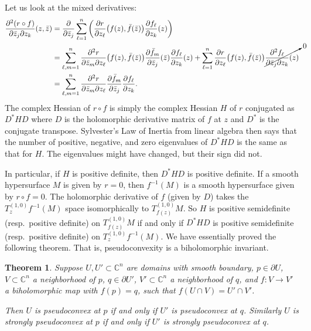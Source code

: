 \documentclass[12pt,openany]{book}
\newcommand{\C}{{\mathbb{C}}}
\theoremstyle{plain}
\newtheorem{thm}{Theorem}[section]
\theoremstyle{remark}
\theoremstyle{definition}
\theoremstyle{exercise}
\theoremstyle{example}
\begin{document}
Let us look at the mixed derivatives:
\begin{equation*}
\begin{split}
\frac{\partial^2 (r \circ f)}{\partial \bar{z}_j \partial z_k} (z,\bar{z})
& =
\frac{\partial}{\partial \bar{z}_j }
\sum_{\ell=1}^n 
\left(
\frac{\partial r}{\partial z_\ell} \bigl(f(z),\bar{f}(\bar{z})\bigr)
\frac{\partial f_\ell}{\partial z_k} (z) 
\right)
\\
& =
\sum_{\ell,m=1}^n 
\frac{\partial^2 r}{\partial \bar{z}_m \partial z_\ell }
\bigl(f(z),\bar{f}(\bar{z})\bigr)
\frac{\partial \bar{f}_m}{\partial \bar{z}_j} (\bar{z}) 
\frac{\partial f_\ell}{\partial z_k} (z) 
+
\sum_{\ell=1}^n 
\frac{\partial r}{\partial z_\ell} \bigl(f(z),\bar{f}(\bar{z})\bigr)
\cancelto{0}{\frac{\partial^2 f_\ell}{\partial \bar{z}_j \partial z_k} (z)}
\\
&=
\sum_{\ell,m=1}^n 
\frac{\partial^2 r}{\partial \bar{z}_m \partial z_\ell}
\frac{\partial \bar{f}_m}{\partial \bar{z}_j} 
\frac{\partial f_\ell}{\partial z_k} .
\end{split}
\end{equation*}
The complex Hessian of $r \circ f$ is simply the complex Hessian $H$ of $r$
conjugated as $D^*HD$ where $D$ is the holomorphic
derivative matrix of $f$ at $z$ and
$D^*$ is the conjugate transpose.  Sylvester's Law of Inertia from linear
algebra then says that the number of positive, negative, and zero
eigenvalues of $D^*HD$ is the same as that for $H$.  The
eigenvalues might have changed, but their sign did not.

In particular, if $H$ is positive definite, then $D^*HD$ is positive
definite.  If a smooth hypersurface $M$ is given by $r=0$, then $f^{-1}(M)$ is
a smooth hypersurface given by $r \circ f = 0$.
The holomorphic derivative of $f$ (given by $D$)
takes the
$T_{z}^{(1,0)}f^{-1}(M)$
space isomorphically to
$T_{f(z)}^{(1,0)}M$.
So $H$ is positive semidefinite (resp.\ positive definite)
on $T_{f(z)}^{(1,0)}M$ if and only if $D^*HD$ is positive semidefinite
(resp.\ positive definite) on
$T_{z}^{(1,0)} f^{-1}(M)$.
We have essentially proved the following theorem.  That is, pseudoconvexity is a
biholomorphic invariant.

\begin{thm}
Suppose $U, U' \subset \C^n$ are domains with smooth boundary,
$p \in \partial U$, $V \subset \C^n$ a neighborhood of $p$,
$q \in \partial U'$, $V' \subset \C^n$ a neighborhood of $q$,
and $f \colon V \to V'$ a biholomorphic map with $f(p) = q$, such that
$f(U \cap V) = U' \cap V'$.

Then $U$ is pseudoconvex at $p$ if and only if $U'$ is pseudoconvex at $q$.
Similarly
$U$ is strongly pseudoconvex at $p$ if and only if $U'$ is strongly pseudoconvex at $q$.
\end{thm}
\end{document}
